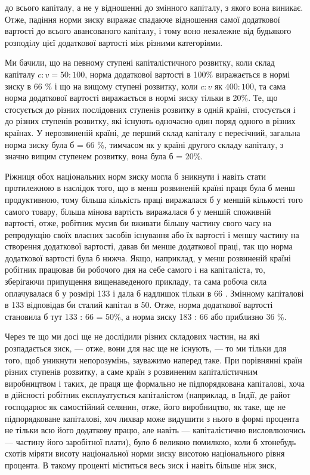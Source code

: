 \parcont{}  %
до всього капіталу, а не у відношенні до змінного капіталу, з
якого вона виникає. Отже, падіння норми зиску виражає спадаюче
відношення самої додаткової вартості до всього авансованого
капіталу, і тому воно незалежне від будьякого розподілу
цієї додаткової вартості між різними категоріями.

Ми бачили, що на певному ступені капіталістичного розвитку,
коли склад капіталу $c : v = 50 : 100$, норма додаткової вартості
в 100\% виражається в нормі зиску в 66 \% і що на вищому
ступені розвитку, коли $c : v$ як $400 : 100$, та сама норма додаткової
вартості виражається в нормі зиску тільки в 20\%. Те, що
стосується до різних послідовних ступенів розвитку в одній
країні, стосується і до різних ступенів розвитку, які існують
одночасно один поряд одного в різних країнах. У нерозвиненій
країні, де перший склад капіталу є пересічний, загальна норма
зиску була б = 66 \%, тимчасом як у країні другого складу капіталу,
з значно вищим ступенем розвитку, вона була б = 20\%.

Ріжниця обох національних норм зиску могла б зникнути і
навіть стати протилежною в наслідок того, що в менш розвиненій
країні праця була б менш продуктивною, тому більша
кількість праці виражалася б у меншій кількості того самого
товару, більша мінова вартість виражалася б у меншій споживній
вартості, отже, робітник мусив би вживати більшу частину
свого часу на репродукцію своїх власних засобів існування або
їх вартості і меншу частину на створення додаткової вартості,
давав би менше додаткової праці, так що норма додаткової
вартості була б нижча. Якщо, наприклад, у менш розвиненій країні
робітник працював би  робочого дня на себе самого і  на
капіталіста, то, зберігаючи припущення вищенаведеного прикладу,
та сама робоча сила оплачувалася б у розмірі 133  і дала б
надлишок тільки в 66 . Змінному капіталові в 133  відповідав
би сталий капітал в 50. Отже, норма додаткової вартості становила
б тут 133  : 66 = 50\%, а норма зиску 183 :
66 або приблизно 36 \%.

Через те що ми досі ще не дослідили різних складових частин,
на які розпадається зиск, — отже, вони для нас ще не існують,
— то ми тільки для того, щоб уникнути непорозумінь,
зауважимо наперед таке. При порівнянні країн різних ступенів
розвитку, а саме країн з розвиненим капіталістичним виробництвом
і таких, де праця ще формально не підпорядкована капіталові,
хоча в дійсності робітник експлуатується капіталістом
(наприклад, в Індії, де райот господарює як самостійний селянин,
отже, його виробництво, як таке, ще не підпорядковане капіталові,
хоч лихвар може видушити з нього в формі процента
не тільки всю його додаткову працю, але навіть — капіталістично
висловлюючись — частину його заробітної плати), було б
великою помилкою, коли б хтонебудь схотів міряти висоту національної
норми зиску висотою національного рівня процента.
В такому проценті міститься весь зиск і навіть більше ніж зиск,
\parbreak{}  %
